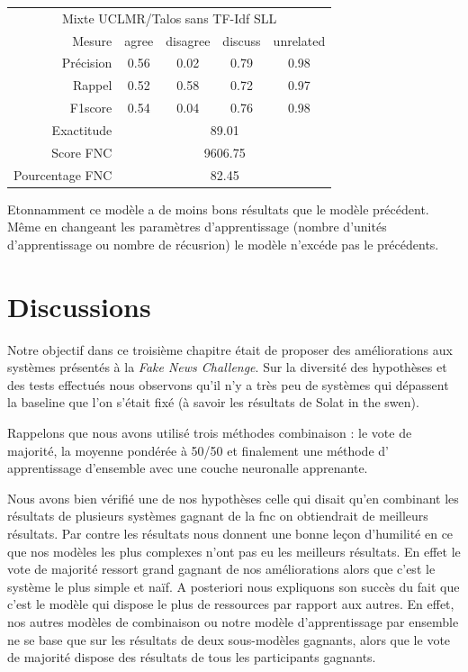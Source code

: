 \documentclass[11pt,a4paper,oldfontcommands]{memoir}
\begin{document}
\begin{center}
 \begin{tabular}{ r | c c c c }
  \multicolumn{5}{c}{Mixte UCLMR/Talos sans TF-Idf SLL}                          \\
  Mesure          & agree                       & disagree & discuss & unrelated \\
  \hline
  Précision       & 0.56                        & 0.02     & 0.79    & 0.98      \\
  Rappel          & 0.52                        & 0.58     & 0.72    & 0.97      \\
  F1score         & 0.54                        & 0.04     & 0.76    & 0.98      \\
  \hline
  \hline
  Exactitude      & \multicolumn{4}{c}{89.01}                                    \\
  Score FNC       & \multicolumn{4}{c}{9606.75}                                  \\
  Pourcentage FNC & \multicolumn{4}{c}{82.45}                                    \\
 \end{tabular}
\end{center}

Etonnamment ce modèle a de moins bons résultats que le modèle précédent.
Même en changeant les paramètres d'apprentissage (nombre d'unités d'apprentissage ou nombre de récusrion) le modèle n'excéde pas le précédents.
\section{Discussions}

Notre objectif dans ce troisième chapitre était de proposer des améliorations aux systèmes présentés à la \textit{Fake News Challenge}. Sur la diversité des hypothèses et des tests effectués nous observons qu'il n'y a très peu de systèmes qui dépassent la baseline que l'on s'était fixé (à savoir les résultats de Solat in the swen).

Rappelons que nous avons utilisé trois méthodes combinaison : le vote de majorité, la moyenne pondérée à 50/50 et finalement une méthode d' apprentissage d'ensemble avec une couche neuronalle apprenante.

Nous avons bien vérifié une de nos hypothèses celle qui disait qu'en combinant les résultats de plusieurs systèmes gagnant de la fnc on obtiendrait de meilleurs résultats.
Par contre les résultats nous donnent une bonne leçon d'humilité en ce que nos modèles les plus complexes n'ont pas eu les meilleurs résultats.
En effet le vote de majorité ressort grand gagnant de nos améliorations alors que c'est le système le plus simple et naïf.
A posteriori nous expliquons son succès du fait que c'est le modèle qui dispose le plus de ressources par rapport aux autres. En effet, nos autres modèles de combinaison ou notre modèle d'apprentissage par ensemble ne se base que sur les résultats de deux sous-modèles gagnants, alors que le vote de majorité dispose des résultats de tous les participants gagnants.
\end{document}
